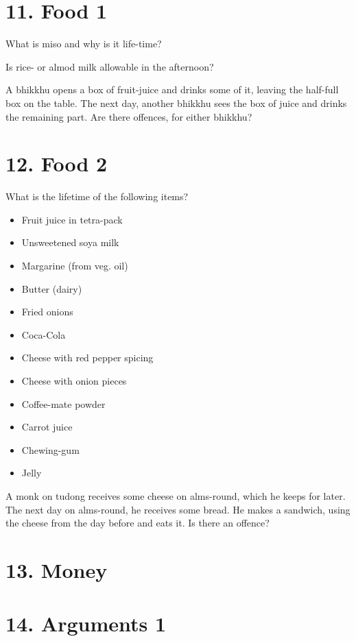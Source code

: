 \section{11. Food 1}

What is miso and why is it life-time?

Is rice- or almod milk allowable in the afternoon?

A bhikkhu opens a box of fruit-juice and drinks some of it, leaving the
half-full box on the table. The next day, another bhikkhu sees the box
of juice and drinks the remaining part. Are there offences, for either
bhikkhu?

\section{12. Food 2}

What is the lifetime of the following items?

\begin{itemize}
\tightlist
\item
  Fruit juice in tetra-pack
\item
  Unsweetened soya milk
\item
  Margarine (from veg. oil)
\item
  Butter (dairy)
\item
  Fried onions
\item
  Coca-Cola
\item
  Cheese with red pepper spicing
\item
  Cheese with onion pieces
\item
  Coffee-mate powder
\item
  Carrot juice
\item
  Chewing-gum
\item
  Jelly
\end{itemize}

A monk on tudong receives some cheese on alms-round, which he keeps for
later. The next day on alms-round, he receives some bread. He makes a
sandwich, using the cheese from the day before and eats it. Is there an
offence?

\section{13. Money}

\section{14. Arguments 1}

